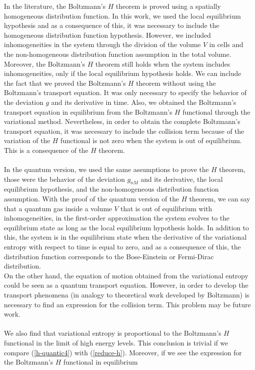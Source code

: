 \documentclass{article}
\begin{document}
In the literature, the Boltzmann's $H$ theorem is proved using a spatially homogeneous distribution function. In this work, we used the local equilibrium hypothesis and as a consequence of this, it was necessary to include the homogeneous distribution function hypothesis. However, we included inhomogeneities in the system through the division of the volume $V$ in cells and the non-homogeneous distribution function assumption in the total volume. Moreover, the Boltzmann's $H$ theorem still holds when the system includes inhomogeneities, only if the local equilibrium hypothesis holds. We can include the fact that we proved the Boltzmann's $H$ theorem without using the Boltzmann's transport equation. It was only necessary to specify the behavior of the deviation $g$ and its derivative in time. Also, we obtained the Boltzmann's transport equation in equilibrium from the Boltzmann's $H$ functional through the variational method. Nevertheless, in order to obtain the complete Boltzmann's transport equation, it was necessary to include the collision term because of the variation of the $H$ functional is not zero when the system is out of equilibrium. This is a consequence of the $H$ theorem.\\
\\
In the quantum version, we used the same assumptions to prove the $H$ theorem, those were the behavior of the deviation $g_{nM}$ and its derivative, the local equilibrium hypothesis, and the non-homogeneous distribution function assumption. With the proof of the quantum version of the $H$ theorem, we can say that a quantum gas inside a volume $V$ that is out of equilibrium with inhomogeneities, in the first-order approximation the system evolves to the equilibrium state as long as the local equilibrium hypothesis holds. In addition to this, the system is in the equilibrium state when the derivative of the variational entropy with respect to time is equal to zero, and as a consequence of this, the distribution function corresponds to the Bose-Einstein or Fermi-Dirac distribution.\\
On the other hand, the equation of motion obtained from the variational entropy could be seen as a quantum transport equation. However, in order to develop the transport phenomena (in analogy to theoretical work developed by Boltzmann) is necessary to find an expression for the collision term. This problem may be future work.\\
\\
We also find that variational entropy is proportional to the Boltzmann's $H$ functional in the limit of high energy levels. This conclusion is trivial if we compare (\ref{h-quantic4}) with (\ref{reduce-h}). Moreover, if we see the expression for the Boltzmann's $H$ functional in equilibrium
\end{document}
